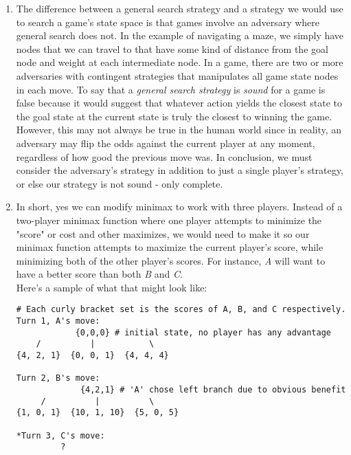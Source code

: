 \documentclass{article}
\begin{document}
\begin{enumerate}
    \item %
    The difference between a general search strategy and a strategy we would use to search a game's state space is that games involve an adversary where general search does not. In the example of navigating a maze, we simply have nodes that we can travel to that have some kind of distance from the goal node and weight at each intermediate node. In a game, there are two or more adversaries with contingent strategies that manipulates all game state nodes in each move. To say that a \textit{general search strategy} is \textit{sound} for a game is false because it would suggest that whatever action yields the closest state to the goal state at the current state is truly the closest to winning the game. However, this may not always be true in the human world since in reality, an adversary may flip the odds against the current player at any moment, regardless of how good the previous move was. In conclusion, we must consider the adversary's strategy in addition to just a single player's strategy, or else our strategy is not sound - only complete.

    \item
    In short, yes we can modify minimax to work with three players. Instead of a two-player minimax function where one player attempts to minimize the "score" or cost and other maximizes, we would need to make it so our minimax function attempts to maximize the current player's score, while minimizing both of the other player's scores. For instance, \textit{A} will want to have a better score than both \textit{B} and \textit{C}.
    \\Here's a sample of what that might look like:
\begin{verbatim}
# Each curly bracket set is the scores of A, B, and C respectively.
Turn 1, A's move:
            {0,0,0} # initial state, no player has any advantage
    /          |           \
{4, 2, 1}  {0, 0, 1}  {4, 4, 4}

Turn 2, B's move:
             {4,2,1} # 'A' chose left branch due to obvious benefit
     /          |          \
{1, 0, 1}  {10, 1, 10}  {5, 0, 5}

*Turn 3, C's move:
         ?
\end{verbatim}


\end{enumerate}
\end{document}
